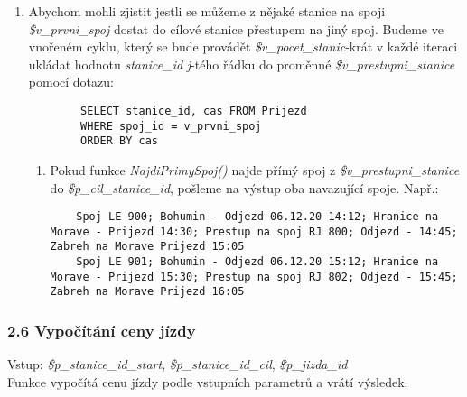 \documentclass[11pt]{article}
\begin{document}
\begin{enumerate}
\begin{enumerate}
        \item Abychom mohli zjistit jestli se můžeme z nějaké stanice na spoji \textit{\$v\_prvni\_spoj} dostat do cílové stanice přestupem na jiný spoj. Budeme ve vnořeném cyklu, který se bude provádět \textit{\$v\_pocet\_stanic}-krát v každé iteraci ukládat hodnotu \textit{stanice\_id} \textit{j}-tého řádku do proměnné \textit{\$v\_prestupni\_stanice} pomocí dotazu:
        \begin{lstlisting}
        SELECT stanice_id, cas FROM Prijezd
        WHERE spoj_id = v_prvni_spoj
        ORDER BY cas
        \end{lstlisting}

        \begin{enumerate}
            \item Pokud funkce \textit{NajdiPrimySpoj()} najde přímý spoj z \textit{\$v\_prestupni\_stanice} do \textit{\$p\_cil\_stanice\_id}, pošleme na výstup oba navazující spoje. Např.:
            \begin{lstlisting}
    Spoj LE 900; Bohumin - Odjezd 06.12.20 14:12; Hranice na Morave - Prijezd 14:30; Prestup na spoj RJ 800; Odjezd - 14:45; Zabreh na Morave Prijezd 15:05
    Spoj LE 901; Bohumin - Odjezd 06.12.20 15:12; Hranice na Morave - Prijezd 15:30; Prestup na spoj RJ 802; Odjezd - 15:45; Zabreh na Morave Prijezd 16:05
            \end{lstlisting}
        \end{enumerate}
    \end{enumerate}
\end{enumerate}

\newpage

\subsubsection*{2.6 Vypočítání ceny jízdy}
Vstup: \textit{\$p\_stanice\_id\_start}, \textit{\$p\_stanice\_id\_cil}, \textit{\$p\_jizda\_id}\\
Funkce vypočítá cenu jízdy podle vstupních parametrů a vrátí výsledek.
\end{document}
